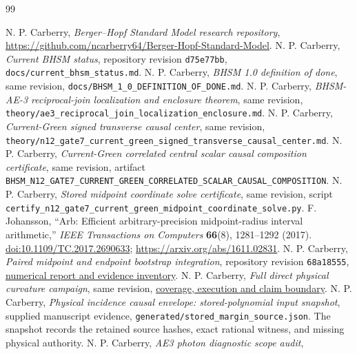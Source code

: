 \documentclass[11pt]{article}
\begin{document}
\begin{thebibliography}{99}
\raggedright
{} N. P. Carberry, \emph{Berger--Hopf Standard Model research
repository}, \url{https://github.com/ncarberry64/Berger-Hopf-Standard-Model}.
 N. P. Carberry, \emph{Current BHSM status}, repository
revision \texttt{d75e77bb}, \texttt{docs/current\_bhsm\_status.md}.
 N. P. Carberry, \emph{BHSM 1.0 definition of done}, same
revision, \texttt{docs/BHSM\_1\_0\_DEFINITION\_OF\_DONE.md}.
 N. P. Carberry, \emph{BHSM-AE-3 reciprocal-join localization
and enclosure theorem}, same revision,
\texttt{theory/ae3\_reciprocal\_join\_localization\_enclosure.md}.
 N. P. Carberry, \emph{Current-Green signed transverse
causal center}, same revision,
\texttt{theory/n12\_gate7\_current\_green\_signed\_transverse\_causal\_center.md}.
 N. P. Carberry, \emph{Current-Green correlated central
scalar causal composition certificate}, same revision, artifact
\texttt{BHSM\_N12\_GATE7\_CURRENT\_GREEN\_CORRELATED\_SCALAR\_CAUSAL\_COMPOSITION}.
 N. P. Carberry, \emph{Stored midpoint coordinate solve
certificate}, same revision, script
\texttt{certify\_n12\_gate7\_current\_green\_midpoint\_coordinate\_solve.py}.
 F. Johansson, ``Arb: Efficient arbitrary-precision
midpoint-radius interval arithmetic,'' \emph{IEEE Transactions on Computers}
\textbf{66}(8), 1281--1292 (2017).
\href{https://doi.org/10.1109/TC.2017.2690633}{doi:10.1109/TC.2017.2690633};
\url{https://arxiv.org/abs/1611.02831}.
 N. P. Carberry, \emph{Paired midpoint and endpoint
bootstrap integration}, repository revision \texttt{68a18555},
\href{https://github.com/ncarberry64/Berger-Hopf-Standard-Model/blob/68a185556d786fc5e13ff533c358f1cbfaaf074f/docs/BHSM_N12_GATE7_MIDPOINT_AND_BOOTSTRAP_INTEGRATION_20260913.md}{numerical report and evidence inventory}.
 N. P. Carberry, \emph{Full direct physical curvature
campaign}, same revision,
\href{https://github.com/ncarberry64/Berger-Hopf-Standard-Model/blob/68a185556d786fc5e13ff533c358f1cbfaaf074f/theory/n12_gate7_full_direct_curvature_campaign.md}{coverage, execution and claim boundary}.
 N. P. Carberry, \emph{Physical incidence causal
envelope: stored-polynomial input snapshot}, supplied manuscript evidence,
\texttt{generated/stored\_margin\_source.json}. The snapshot records the
retained source hashes, exact rational witness, and missing physical authority.
 N. P. Carberry, \emph{AE3 photon diagnostic scope audit},

\end{thebibliography}
\end{document}

